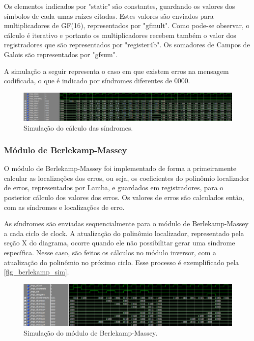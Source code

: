 	Os elementos indicados por "static" são constantes, guardando os valores dos símbolos de cada umas raízes citadas. Estes valores são enviados para multiplicadores de GF(16), representados por "gfmult". Como pode-se observar, o cálculo é iterativo e portanto os multiplicadores recebem também o valor dos registradores que são representados por "register4b". Os somadores de Campos de Galois são representados por "gfsum".
	
	A simulação a seguir representa o caso em que existem erros na mensagem codificada, o que é indicado por síndromes diferentes de 0000.
	
	\begin{figure}[h]
		\caption{\label{fig_sindrome_sim}Simulação do cálculo das síndromes.}
		\centering
		\includegraphics[width=1\textwidth]{RS/Sim_sindrome.PNG}
	\end{figure}

	\subsubsection{Módulo de Berlekamp-Massey}
	
	O módulo de Berlekamp-Massey foi implementado de forma a primeiramente calcular as localizações dos erros, ou seja, os coeficientes do polinômio localizador de erros, representados por Lamba, e guardados em registradores, para o posterior cálculo dos valores dos erros. Os valores de erros são calculados então, com as síndromes e localizações de erro.
	
	As síndromes são enviadas sequencialmente para o módulo de Berlekamp-Massey a cada ciclo de clock. A atualização do polinômio localizador, representado pela seção X do diagrama, ocorre quando ele não possibilitar gerar uma síndrome específica. Nesse caso, são feitos os cálculos no módulo inversor, com a atualização do polinômio no próximo ciclo. Esse processo é exemplificado pela \autoref{fig_berlekamp_sim}.
	
	\begin{figure}[!htb]
		\caption{\label{fig_berlekamp_sim}Simulação do módulo de Berlekamp-Massey.}
		\centering
		\includegraphics[width=1\textwidth]{RS/Sim_berlekamp.PNG}
	\end{figure}
	
